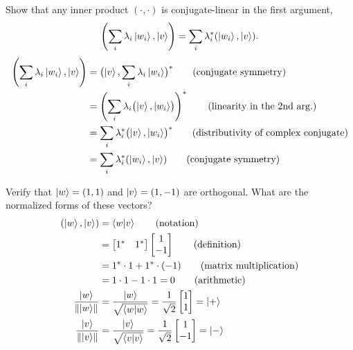  Show that any inner product $(\cdot,\cdot)$ is conjugate-linear in the first argument,
\[
\left(\sum_i \lambda_i\ket{w_i}, \ket{v}\right) = \sum_i \lambda_i^{*}(\ket{w_i}, \ket{v}).
\]
\Soln
\begin{align*}
	\left(\sum_i \lambda_i \ket{w_i},\ket{v}\right) &=
	\bigl(\ket{v},\sum_i \lambda_i \ket{w_i}\bigr)^* \tag{conjugate symmetry}\\
	&= \left(\sum_i \lambda_i \bigl(\ket{v},\ket{w_i}  \bigr) \right)^*\tag{linearity in the 2nd arg.}\\
	&= \sum_i \lambda_i^* \bigl(\ket{v},\ket{w_i} \bigr)^* \tag{distributivity of complex conjugate}\\
	&= \sum_i \lambda_i^* (\ket{w_i},\ket{v}) \tag{conjugate symmetry}
\end{align*}

 Verify that $\ket{w} = (1,1)$ and $\ket{v} = (1,-1)$ are orthogonal.  What are the normalized forms of these vectors?
\Soln
\begin{align*}
	 (\ket{w}, \ket{v}) &= 	\braket{w | v} \tag{notation} \\
	 &= \begin{bmatrix}
		1^* & 1^*
		\end{bmatrix}
		\begin{bmatrix}
		1 \\
		-1
		\end{bmatrix} \tag{definition}\\
	&= 1^*\cdot1 + 1^*\cdot(-1) \tag{matrix multiplication} \\
	&= 1\cdot1 - 1\cdot1 = 0 \tag{arithmetic}\\
%
	\frac{\ket{w}}{\norm{\ket{w}}} &=
	\frac{\ket{w}}{\sqrt{\braket{w|w}}} = \frac{1}{\sqrt{2}} \begin{bmatrix}
	1 \\
	1
	\end{bmatrix}
	= \ket{+} \\
%
	\frac{\ket{v}}{\norm{\ket{v}}} &=
	\frac{\ket{v}}{\sqrt{\braket{v|v}}} = \frac{1}{\sqrt{2}} \begin{bmatrix}
	1 \\
	-1
	\end{bmatrix}
	=\ket{-}
\end{align*}

